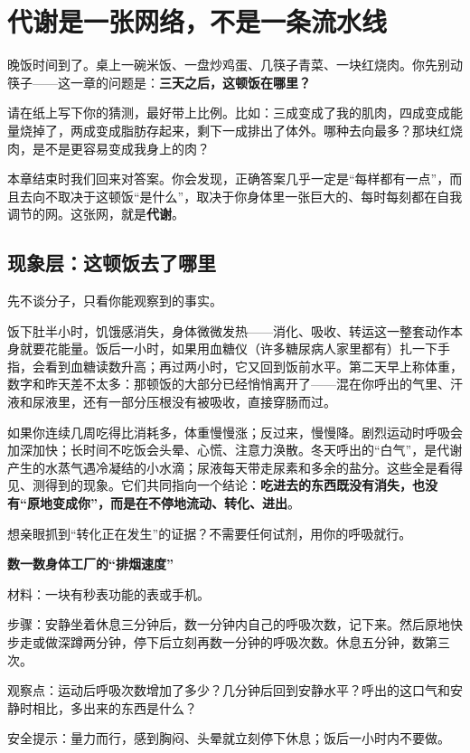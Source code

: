 \chapter{代谢是一张网络，不是一条流水线}

\begin{kaichang}
晚饭时间到了。桌上一碗米饭、一盘炒鸡蛋、几筷子青菜、一块红烧肉。你先别动筷子——这一章的问题是：\textbf{三天之后，这顿饭在哪里？}

请在纸上写下你的猜测，最好带上比例。比如：三成变成了我的肌肉，四成变成能量烧掉了，两成变成脂肪存起来，剩下一成排出了体外。哪种去向最多？那块红烧肉，是不是更容易变成我身上的肉？

本章结束时我们回来对答案。你会发现，正确答案几乎一定是“每样都有一点”，而且去向不取决于这顿饭“是什么”，取决于你身体里一张巨大的、每时每刻都在自我调节的网。这张网，就是\textbf{代谢}。
\end{kaichang}

\section{现象层：这顿饭去了哪里}

先不谈分子，只看你能观察到的事实。

饭下肚半小时，饥饿感消失，身体微微发热——消化、吸收、转运这一整套动作本身就要花能量。饭后一小时，如果用血糖仪（许多糖尿病人家里都有）扎一下手指，会看到血糖读数升高；再过两小时，它又回到饭前水平。第二天早上称体重，数字和昨天差不太多：那顿饭的大部分已经悄悄离开了——混在你呼出的气里、汗液和尿液里，还有一部分压根没有被吸收，直接穿肠而过。

如果你连续几周吃得比消耗多，体重慢慢涨；反过来，慢慢降。剧烈运动时呼吸会加深加快；长时间不吃饭会头晕、心慌、注意力涣散。冬天呼出的“白气”，是代谢产生的水蒸气遇冷凝结的小水滴；尿液每天带走尿素和多余的盐分。这些全是看得见、测得到的现象。它们共同指向一个结论：\textbf{吃进去的东西既没有消失，也没有“原地变成你”，而是在不停地流动、转化、进出}。

想亲眼抓到“转化正在发生”的证据？不需要任何试剂，用你的呼吸就行。

\begin{shiyan}
\textbf{数一数身体工厂的“排烟速度”}

材料：一块有秒表功能的表或手机。

步骤：安静坐着休息三分钟后，数一分钟内自己的呼吸次数，记下来。然后原地快步走或做深蹲两分钟，停下后立刻再数一分钟的呼吸次数。休息五分钟，数第三次。

观察点：运动后呼吸次数增加了多少？几分钟后回到安静水平？呼出的这口气和安静时相比，多出来的东西是什么？

安全提示：量力而行，感到胸闷、头晕就立刻停下休息；饭后一小时内不要做。
\end{shiyan}

